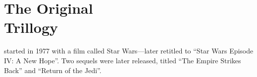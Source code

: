 
\part[The Original Trillogy]{The Original\\Trillogy}
	\label{part:original-trillogy}%



 started in 1977 with a film called Star Wars\cite{wars1977episode}---later retitled to ``Star Wars Episode IV: A New Hope''.  Two sequels were later released, titled ``The Empire Strikes Back'' and ``Return of the Jedi''.

